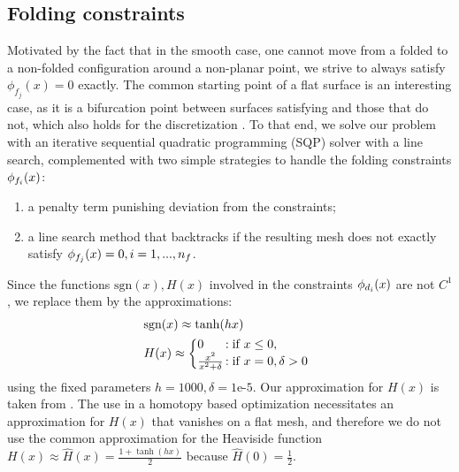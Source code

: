 \subsection{Folding constraints}
Motivated by the fact that in the smooth case, one cannot move from a folded to a non-folded configuration around a non-planar point, we strive to always satisfy $\phi_{f_j}(x) = 0$ exactly. The common starting point of a flat surface is an interesting case, as it is a bifurcation point between surfaces satisfying  and those that do not, which also holds for the discretization . To that end, we solve our problem with an iterative sequential quadratic programming (SQP) solver with a line search, complemented with two simple strategies to handle the folding constraints $\phi_{f_i}(x)$:
\begin{enumerate}
	\item a penalty term \cite{nocedal} punishing  deviation from the constraints; \label{opt:penalty}
	\item a line search method that backtracks if the resulting mesh does not exactly satisfy $\phi_{f_j}(x) = 0, i = 1,...,n_f$.
\end{enumerate}
Since the functions $\text{sgn}(x),H(x)$ involved in the constraints $\phi_{d_i}(x)$ are not $C^1$, we replace them by the approximations:
%
\begin{align} 
\begin{split}\label{eq:const_inner}
&\text{sgn}(x) \approx \tanh(hx) \\
&H(x) \approx  \left\{\begin{array}{@{}l@{\thinspace}l}
0  &: \text{if } x \leq 0, \\
\frac{x^2}{x^2+\delta} &: \text{if } x = 0, \delta > 0 \\
\end{array}\right.
\end{split}
\end{align}
using the fixed parameters $h=1000,\delta = \text{1e-5}$. Our approximation for $H(x)$ is taken from \cite{l0_approximation,autocuts}.  The use in a homotopy based optimization necessitates an approximation for $H(x)$ that vanishes on a flat mesh, and therefore we do not use the common approximation for the Heaviside function $H(x) \approx \hat{H}(x) =  \frac{1+\tanh(hx)}{2}$ because $\hat H(0) = \frac{1}{2}$.

